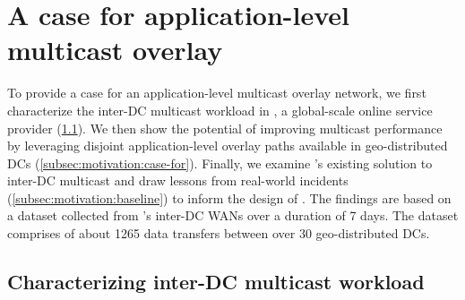 \section{A case for application-level multicast overlay}
\label{sec:motivation}


To provide a case for an
application-level multicast overlay network,
we first characterize the inter-DC multicast workload in
\company, a global-scale online service provider
(\Section\ref{subsec:motivation:multicast-traffic}).
We then show the potential of improving multicast performance
by leveraging disjoint application-level overlay paths available in geo-distributed DCs
(\Section\ref{subsec:motivation:case-for}).
Finally, we examine \company's existing solution to
inter-DC multicast and draw lessons from real-world
incidents (\Section\ref{subsec:motivation:baseline})
to inform the design of \name.
The findings are based on a dataset collected from \company's
inter-DC WANs over a duration of 7 days.
The dataset comprises of about 1265 data transfers
between over 30 geo-distributed DCs.




\subsection{Characterizing inter-DC multicast workload}
\label{subsec:motivation:multicast-traffic}


